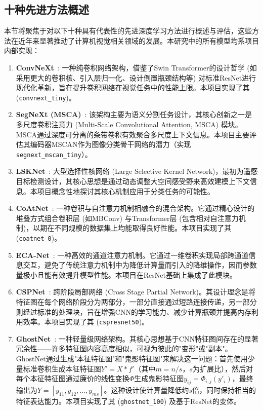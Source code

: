 \documentclass[a4paper]{article}
\begin{document}
\subsection{十种先进方法概述}
本节将聚焦于对以下十种具有代表性的先进深度学习方法进行概述与评估，这些方法在近年来显著推动了计算机视觉相关领域的发展。本研究中的所有模型均系项目内部实现：
\begin{enumerate}
    \item \textbf{ConvNeXt}~\cite{liu2022convnet}: 一种纯卷积网络架构，借鉴了Swin Transformer的设计哲学 (如采用更大的卷积核、引入层归一化、设计倒置瓶颈结构等) 对标准ResNet进行现代化革新，旨在提升卷积网络在视觉任务中的性能上限。本项目实现了其 (\texttt{convnext\_tiny})。
    
    \item \textbf{SegNeXt (MSCA)}~\cite{guo2022segnext}: 该架构主要为语义分割任务设计，其核心创新之一是多尺度卷积注意力 (Multi-Scale Convolutional Attention, MSCA) 模块。MSCA通过深度可分离的条带卷积有效聚合多尺度上下文信息。本项目主要评估其编码器MSCAN作为图像分类骨干网络的潜力（实现 \texttt{segnext\_mscan\_tiny}）。
    
    \item \textbf{LSKNet}~\cite{li2023large}: 大型选择性核网络 (Large Selective Kernel Network)，最初为遥感目标检测设计，其核心思想是通过动态调整大空间感受野来高效建模上下文信息。本项目概念性地探讨其核心机制应用于分类任务的可能性。
    
    \item \textbf{CoAtNet}~\cite{dai2021coatnet}: 一种卷积与自注意力机制相融合的混合架构。它通过精心设计的堆叠方式组合卷积层 (如MBConv) 与Transformer层 (包含相对自注意力机制)，以期在不同规模的数据集上均能取得良好性能。本项目实现了其 (\texttt{coatnet\_0})。
    
    \item \textbf{ECA-Net}~\cite{wang2020ecanet}: 一种高效的通道注意力机制。它通过一维卷积实现局部跨通道信息交互，避免了传统注意力机制中为降低计算量而引入的降维操作，因而参数量极小且能有效提升模型性能。本项目在ResNet基础上集成了此模块。
    
    \item \textbf{CSPNet}~\cite{wang2020cspnet}: 跨阶段局部网络 (Cross Stage Partial Network)。其设计理念是将特征图在每个网络阶段分为两部分，一部分直接通过短路连接传递，另一部分则经过标准的处理块，旨在增强CNN的学习能力、减少计算瓶颈并提高内存利用效率。本项目实现了其 (\texttt{cspresnet50})。
    
    \item \textbf{GhostNet}~\cite{han2020ghostnet}: 一种轻量级网络架构。其核心思想基于CNN特征图间存在的显著冗余性——许多特征图内容高度相似，可视为彼此的"变形"或"副本"。GhostNet通过生成"本征特征图"和"鬼影特征图"来解决这一问题：首先使用少量标准卷积生成本征特征图\( Y' = X * f' \)（其中\( m = n/s \)，\(s\)为扩展比），然后对每个本征特征图通过廉价的线性变换\( \Phi \)生成鬼影特征图\( y_{ij} = \Phi_{i,j}(y'_i) \)，最终输出为\( Y = [y_{11}, y_{12}, ..., y_{ms}] \)。这种设计使计算量降低约\(s\)倍，同时保持相当的特征表达能力。本项目实现了其 (\texttt{ghostnet\_100}) 及基于ResNet的变体。
    

\end{enumerate}
\end{document}
